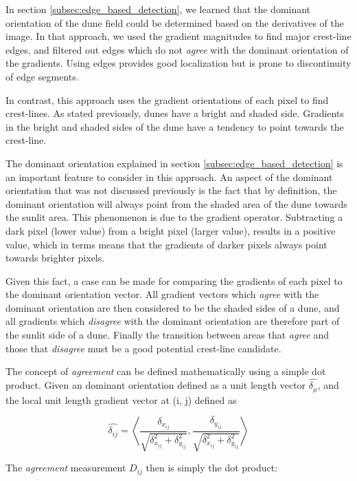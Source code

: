 In section \ref{subsec:edge_based_detection}, we learned that the dominant orientation of the dune field could be determined based on the derivatives of the image. In that approach, we used the gradient magnitudes to find major crest-line edges, and filtered out edges which do not \emph{agree} with the dominant orientation of the gradients. Using edges provides good localization but is prone to discontinuity of edge segments.

In contrast, this approach uses the gradient orientations of each pixel to find crest-lines. As stated previously, dunes have a bright and shaded side. Gradients in the bright and shaded sides of the dune have a tendency to point towards the crest-line.

The dominant orientation explained in section \ref{subsec:edge_based_detection} is an important feature to consider in this approach. An aspect of the dominant orientation that was not discussed previously is the fact that by definition, the dominant orientation will always point from the shaded area of the dune towards the sunlit area. This phenomenon is due to the gradient operator. Subtracting a dark pixel (lower value) from a bright pixel (larger value), results in a positive value, which in terms means that the gradients of darker pixels always point towards brighter pixels.

Given this fact, a case can be made for comparing the gradients of each pixel to the dominant orientation vector. All gradient vectors which \emph{agree} with the dominant orientation are then considered to be the shaded sides of a dune, and all gradients which \emph{disagree} with the dominant orientation are therefore part of the sunlit side of a dune. Finally the transition between areas that \emph{agree} and those that \emph{disagree} must be a good potential crest-line candidate.

The concept of \emph{agreement} can be defined mathematically using a simple dot product. Given an dominant orientation defined as a unit length vector $\hat{\delta_{\mu}}$, and the local unit length gradient vector at (i, j) defined as

\begin{equation}
\hat{\delta_{ij}} = \left\langle \frac{\delta_{x_{ij}}}{\sqrt{\delta_{x_{ij}}^2 + \delta_{y_{ij}}^2}}, \frac{\delta_{y_{ij}}}{\sqrt{\delta_{x_{ij}}^2 + \delta_{y_{ij}}^2}}\right\rangle 
\end{equation}

The \emph{agreement} measurement $D_{ij}$ then is simply the dot product:

